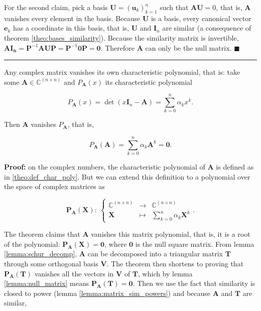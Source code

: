 	For the second claim, pick a basis $\mathbf{U} = \left(\mathbf{u}_k\right)_{k=1}^n$ such that $\mathbf{AU} = 0$, that is, $\mathbf{A}$ vanishes every element in the basis. Because $\mathbf{U}$ is a basis, every canonical vector $\mathbf{e}_k$ has a coordinate in this basis, that is, $\mathbf{U}$ and $\mathbf{I}_n$ are similar (a consequence of theorem \ref{theo:bases_similarity}). Because the similarity matrix is invertible, $\mathbf{AI_n} = \mathbf{P}^{-1}\mathbf{AUP} = \mathbf{P}^{-1}\mathbf{0P} = \mathbf{0}$. Therefore $\mathbf{A}$ can only be the null matrix.
\hfill$\blacksquare$
\vspace{5mm}
\hrule
\vspace{5mm} %
\begin{theorem} \label{theo:cayley_hamilton} %
	Any complex matrix vanishes its own characteristic polynomial, that is: take some $\mathbf{A}\in\mathbb{C}^{(n\times n)}$ and $P_\mathbf{A}\left(x\right)$ its characteristic polynomial

\begin{equation} P_\mathbf{A}\left(x\right) = \det\left(x\mathbf{I}_n - \mathbf{A}\right) = \sum_{k=0}^n \alpha_k x^k. \label{theo:def_char_poly}\end{equation}

	Then $\mathbf{A}$ vanishes $P_\mathbf{A}$, that is,

\begin{equation} P_\mathbf{A}\left(\mathbf{A}\right) = \sum_{k=0}^n \alpha_k \mathbf{A}^k = \mathbf{0}.\end{equation}
\end{theorem}
\noindent\textbf{Proof:} on the complex numbers, the characteristic polynomial of $\mathbf{A}$ is defined as in \eqref{theo:def_char_poly}. But we can extend this definition to a polynomial over the space of complex matrices as

\begin{equation} \mathbf{P_\mathbf{A}}\left(\mathbf{X}\right):\ \left\{\begin{array}{rcl} \mathbb{C}^{(n\times n)} &\to& \mathbb{C}^{(n\times n)}\\[3mm] \mathbf{X} &\mapsto& \displaystyle\sum_{k=0}^n \alpha_k \mathbf{X}^k \end{array}\right. .\label{eq:char_long}\end{equation}

	The theorem claims that $\mathbf{A}$ vanishes this matrix polynomial, that is, it is a root of the polynomial: $\mathbf{P_\mathbf{A}}\left(\mathbf{X}\right) = \mathbf{0}$, where $\mathbf{0}$ is the null square matrix. From lemma \ref{lemma:schur_decomp}, $\mathbf{A}$ can be decomposed into a triangular matrix $\mathbf{T}$ through some orthogonal basis $\mathbf{V}$. The theorem then shortens to proving that $\mathbf{P}_\mathbf{A}\left(\mathbf{T}\right)$ vanishes all the vectors in $\mathbf{V}$ of $\mathbf{T}$, which by lemma \ref{lemma:null_matrix} means $\mathbf{P}_\mathbf{A}\left(\mathbf{T}\right) = \mathbf{0}$. Then we use the fact that similarity is closed to power (lemma \ref{lemma:matrix_sim_powers}) and because $\mathbf{A}$ and $\mathbf{T}$ are similar,

